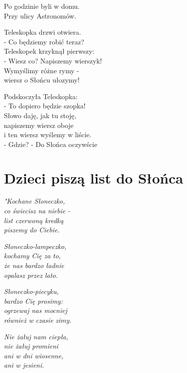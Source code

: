 \documentclass[11pt,a4pape,leqno,twoside]{book}
\begin{document}
Po godzinie byli w domu.\\
Przy ulicy Astronomów.\\ \vspace{0.1cm}

Teleskopka drzwi otwiera.\\
- Co będziemy robić teraz?\\
Teleskopek krzyknął pierwszy:\\
- Wiesz co? Napiszemy wierszyk!\\
Wymyślimy różne rymy -\\
wiersz o Słońcu ułozymy!\\ \vspace{0.1cm}

Podskoczyła Teleskopka:\\
- To dopiero będzie szopka!\\
Słowo daję, jak tu stoję,\\
napiszemy wiersz oboje\\
i ten wiersz wyślemy w liście.\\
- Gdzie? - Do Słońca oczywście

\chapter{Dzieci piszą list do Słońca}
\textit{"Kochane Słoneczko,}\\
\textit{co świecisz na niebie -}\\
\textit{list czerwoną kredką}\\
\textit{piszemy do Ciebie.}\\ \space{0.1cm}

\textit{Słoneczko-lampeczko,}\\
\textit{kochamy Cię za to,}\\
\textit{że nas bardzo ładnie}\\
\textit{opalasz przez lato.}\\ \vspace{0.1cm}

\textit{Słoneczko-piecyku,}\\
\textit{bardzo Cię prosimy:}\\
\textit{ogrzewaj nas mocniej}\\
\textit{również w czasie zimy.}\\ \vspace{0.1cm}

\textit{Nie żałuj nam ciepła,}\\
\textit{nie żałuj promieni}\\
\textit{ani w dni wiosenne,}\\
\textit{ani w jesieni.}\\ \vspace{0.1cm}
\end{document}
